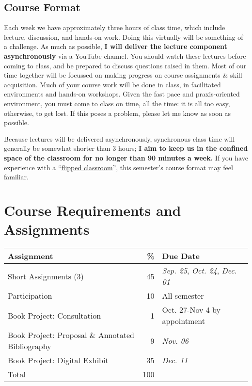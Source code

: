 \documentclass[11pt]{article}
\begin{document}
\subsection*{Course Format}
\label{sec:orgdd1f523}
Each week we have approximately three hours of class time, which include lecture, discussion, and hands-on work. Doing this virtually will be something of a challenge. As much as possible, \textbf{I will deliver the lecture component asynchronously} via a YouTube channel. You should watch these lectures before coming to class, and be prepared to discuss questions raised in them. Most of our time together will be focussed on making progress on course assignments \& skill acquisition. Much of your course work will be done in class, in facilitated environments and hands-on workshops. Given the fast pace and praxis-oriented environment, you must come to class on time, all the time: it is all too easy, otherwise, to get lost. If this poses a problem, please let me know as soon as possible.

Because lectures will be delivered asynchronously, synchronous class time will generally be somewhat shorter than 3 hours; \textbf{I aim to keep us in the confined space of the classroom for no longer than 90 minutes a week.} If you have experience with a ``\href{https://en.wikipedia.org/wiki/Flipped\_classroom}{flipped classroom}'', this semester's course format may feel familiar.

\section*{Course Requirements and Assignments}
\label{sec:orgcf272c9}
\begin{center}
\begin{tabular}{lrl}
\textbf{Assignment} & \textbf{\%} & \textbf{Due Date}\\
\hline
Short Assignments (3) & 45 & \textit{Sep. 25}, \textit{Oct. 24}, \textit{Dec. 01}\\
Participation & 10 & All semester\\
Book Project: Consultation & 1 & Oct. 27-Nov 4 by appointment\\
Book Project: Proposal \& Annotated Bibliography & 9 & \textit{Nov. 06}\\
Book Project: Digital Exhibit & 35 & \textit{Dec. 11}\\
Total & 100 & \\
\end{tabular}
\end{center}
\end{document}
